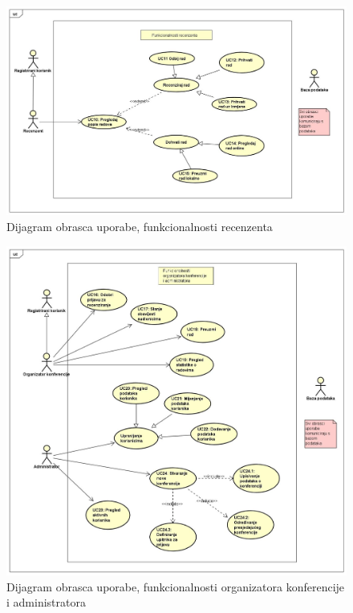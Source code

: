 				\begin{figure}[H]
					\includegraphics[width=1\linewidth]{slike/UCdijagram2} %
					\centering
					\caption{Dijagram obrasca uporabe, funkcionalnosti recenzenta}
					\label{fig:UC2} %
				\end{figure}
				
				\begin{figure}[H]
					\includegraphics[width=1\linewidth]{slike/UCdijagram3} %
					\centering
					\caption{Dijagram obrasca uporabe, funkcionalnosti organizatora konferencije i administratora}
					\label{fig:UC3} %
				\end{figure}
		
